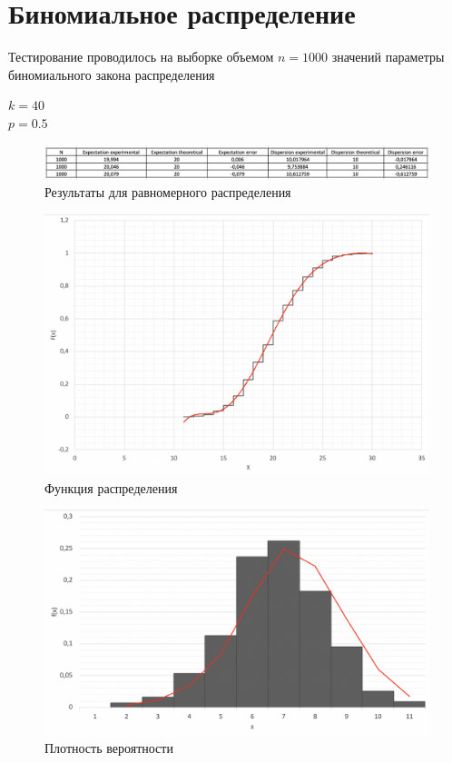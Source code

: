 \documentclass{article}
\begin{document}
	\section{Биномиальное распределение}
		Тестирование проводилось на выборке объемом $n = 1000$ значений параметры биномиального закона распределения
		\begin{center}
			$k = 40$\\ 
			$p = 0.5$\\
		\end{center}
		\begin{center}
			\begin{figure}[!htb]
				\includegraphics[scale = 0.61]{binom/3.png}
				\caption{Результаты для равномерного распределения}
			\end{figure}
		\end{center}
		
		\begin{figure}[!htb]
		    \includegraphics[scale = 0.32]{binom/2.png}
    		\caption{Функция распределения}
		\end{figure}
		 	 	
		\begin{figure}[!htb]
			\includegraphics[scale = 0.32]{binom/1}
			\caption{Плотность вероятности}
   		\end{figure}
	\newpage
\end{document}

